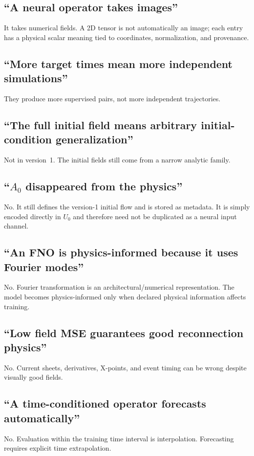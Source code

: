 \documentclass[11pt]{article}
\begin{document}
\subsection{``A neural operator takes images''}
It takes numerical fields. A 2D tensor is not automatically an image; each entry has a physical scalar meaning tied to coordinates, normalization, and provenance.

\subsection{``More target times mean more independent simulations''}
They produce more supervised pairs, not more independent trajectories.

\subsection{``The full initial field means arbitrary initial-condition generalization''}
Not in version~1. The initial fields still come from a narrow analytic family.

\subsection{``$A_0$ disappeared from the physics''}
No. It still defines the version-1 initial flow and is stored as metadata. It is simply encoded directly in $U_0$ and therefore need not be duplicated as a neural input channel.

\subsection{``An FNO is physics-informed because it uses Fourier modes''}
No. Fourier transformation is an architectural/numerical representation. The model becomes physics-informed only when declared physical information affects training.

\subsection{``Low field MSE guarantees good reconnection physics''}
No. Current sheets, derivatives, X-points, and event timing can be wrong despite visually good fields.

\subsection{``A time-conditioned operator forecasts automatically''}
No. Evaluation within the training time interval is interpolation. Forecasting requires explicit time extrapolation.
\end{document}

